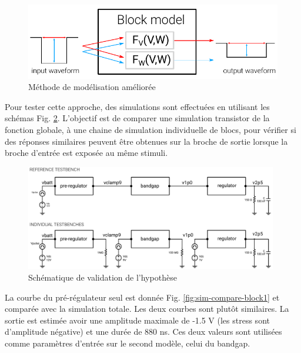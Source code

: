 \begin{figure}[!h]
  \centering
  \includegraphics{src/1/figures/principle_transfert_function_v2.pdf}
  \caption{Méthode de modélisation améliorée}
  \label{fig:principle-transfert-func-v2}
\end{figure}

Pour tester cette approche, des simulations sont effectuées en utilisant les schémas Fig. \ref{fig:hypothesis-setup}.
L'objectif est de comparer une simulation transistor de la fonction globale, à une chaine de simulation individuelle de blocs, pour vérifier si des réponses similaires peuvent être obtenues sur la broche de sortie lorsque la broche d'entrée est exposée au même stimuli.

\begin{figure}[!h]
  \centering
  \includegraphics[width=0.98\textwidth]{src/1/figures/hypothesis_testing_setup.pdf}
  \caption{Schématique de validation de l'hypothèse}
  \label{fig:hypothesis-setup}
\end{figure}

La courbe du pré-régulateur seul est donnée Fig. \ref{fig:sim-compare-block1} et comparée avec la simulation totale.
Les deux courbes sont plutôt similaires.
La sortie est estimée avoir une amplitude maximale de -1.5 V (les stress sont d'amplitude négative) et une durée de 880 ns.
Ces deux valeurs sont utilisées comme paramètres d'entrée sur le second modèle, celui du bandgap.

